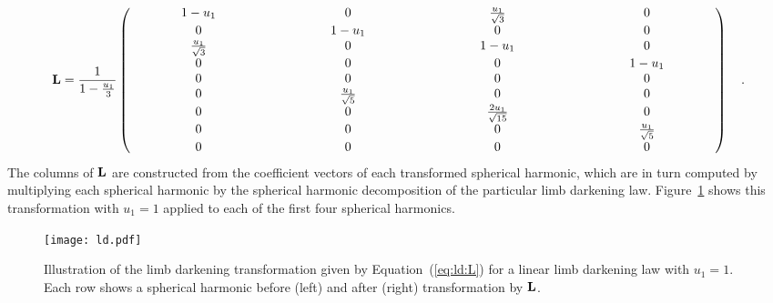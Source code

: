\documentclass[modern]{aastex631}
\begin{document}
\begin{align}
    \label{eq:ld:L}
    {\ensuremath{\mathbf{L}}} =
    \frac{1}{1 - \frac{u_1}{3}}
    \begin{pmatrix}
        \quad\quad\quad\quad1-u_1\quad\quad\quad\quad & 0                       & \frac{u_1}{\sqrt{3}}    & 0                       \\
        0                       & \quad\quad\quad\quad1-u_1\quad\quad\quad\quad & 0                       & 0                       \\
        \frac{u_1}{\sqrt{3}}    & 0                       & \quad\quad\quad\quad1-u_1\quad\quad\quad\quad & 0                       \\
        0                       & 0                       & 0                       & \quad\quad\quad\quad1-u_1\quad\quad\quad\quad \\
        0                       & 0                       & 0                       & 0                       \\
        0                       & \frac{u_1}{\sqrt{5}}    & 0                       & 0                       \\
        0                       & 0                       & \frac{2u_1}{\sqrt{15}}  & 0                       \\
        0                       & 0                       & 0                       & \frac{u_1}{\sqrt{5}}    \\
        0                       & 0                       & 0                       & 0
    \end{pmatrix}
    \quad.
\end{align}
%
The columns of ${\mathbf{L}}$ are constructed from the coefficient vectors of each transformed spherical harmonic, which are in turn computed by multiplying each spherical harmonic by the spherical harmonic decomposition of the particular limb darkening law.
Figure~\ref{fig:ld} shows this transformation with $u_1 = 1$ applied to each of the first four spherical harmonics.
%
\begin{figure}[t!]
    \begin{centering}
        \texttt{[image: ld.pdf]}
        \caption{%
            Illustration of the limb darkening transformation given by Equation~(\ref{eq:ld:L}) for a linear limb darkening law with $u_1 = 1$. 
            Each row shows a spherical harmonic before (left) and after (right) transformation by ${\mathbf{L}}$.
        }
        \label{fig:ld}
    \end{centering}
\end{figure}
%
\end{document}
